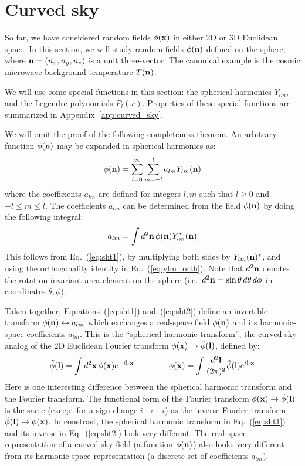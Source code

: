 \documentclass[aps,prd,superscriptaddress,groupedaddress,nofootinbib,nobibnotes]{revtex4}
\newcommand{\be}{\begin{equation}}
\newcommand{\ee}{\end{equation}}
\def\x{{\bf x}}
\def\l{{\bf l}}
\def\n{{\bf n}}
\def\tphi{{\tilde\phi}}
\begin{document}
\clearpage

\section{Curved sky}

So far, we have considered random fields $\phi(\x)$ in either 2D or 3D Euclidean space.
In this section, we will study random fields $\phi(\n)$ defined on the sphere, where $\n = (n_x, n_y, n_z)$
is a unit three-vector.
The canonical example is the cosmic microwave background temperature $T(\n)$.

We will use some special functions in this section: the spherical harmonics $Y_{lm}$,
and the Legendre polynomials $P_l(x)$.  Properties of these special functions are
summarized in Appendix~\ref{app:curved_sky}.

We will omit the proof of the following completeness theorem.
An arbitrary function $\phi(\n)$ may be expanded in spherical harmonics as:
\be
\phi(\n) = \sum_{l=0}^\infty \sum_{m=-l}^l a_{lm} Y_{lm}(\n)   \label{eq:sht1}
\ee
where the coefficients $a_{lm}$ are defined for integers $l,m$ such that $l \ge 0$ and $-l \le m \le l$.
The coefficients $a_{lm}$ can be determined from the field $\phi(\n)$ by doing the following integral:
\be
a_{lm} = \int d^2\n \, \phi(\n) Y_{lm}^*(\n)  \label{eq:sht2}
\ee
This follows from Eq.~(\ref{eq:sht1}), by multiplying both sides by $Y_{lm}(\n)^*$, and using the
orthogonality identity in Eq.~(\ref{eq:ylm_orth}).  Note that $d^2\n$ denotes the rotation-invariant
area element on the sphere (i.e.~$d^2\n = \sin\theta \, d\theta \, d\phi$ in coordinates $\theta,\phi$).

Taken together, Equations~(\ref{eq:sht1}) and~(\ref{eq:sht2}) define an invertible transform 
$\phi(\n) \leftrightarrow a_{lm}$ which exchanges a real-space field $\phi(\n)$ and its harmonic-space
coefficients $a_{lm}$.  This is the ``spherical harmonic transform'', the curved-sky analog of the
2D Euclidean Fourier transform $\phi(\x) \rightarrow \tphi(\l)$, defined by:
\be
\tphi(\l) = \int d^2\x \, \phi(\x) e^{-i\l\cdot\x}
  \hspace{1.5cm}
\phi(\x) = \int \frac{d^2\l}{(2\pi)^2} \tphi(\l) e^{i\l\cdot\x}
\ee
Here is one interesting difference between the spherical harmonic transform and the Fourier transform.
The functional form of the Fourier transform $\phi(\x) \rightarrow \tphi(\l)$ is the same (except for a 
sign change $i \rightarrow -i$) as the inverse Fourier transform $\tphi(\l) \rightarrow \phi(\x)$.
In constrast, the spherical harmonic transform in Eq.~(\ref{eq:sht1}) and its inverse in Eq.~(\ref{eq:sht2})
look very different.
The real-space representation of a curved-sky field (a function $\phi(\n)$) also looks very different from
its harmonic-space representation (a discrete set of coefficients $a_{lm}$).
\end{document}
